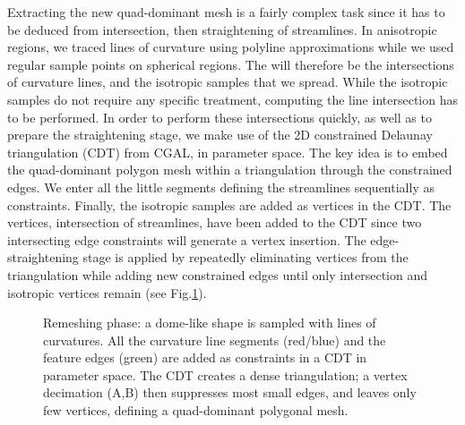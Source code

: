Extracting the new quad-dominant mesh is a fairly complex task since
it has to be deduced from intersection, then straightening of
streamlines.  In anisotropic regions, we traced lines of curvature
using polyline approximations while we used regular sample points on
spherical regions. The  will therefore be the
intersections of curvature lines, and the isotropic samples that we
spread. While the isotropic samples do not require any specific
treatment, computing the line intersection has to be performed.  In
order to perform these intersections quickly, as well as to prepare
the straightening stage, we make use of the 2D constrained Delaunay
triangulation (CDT) from CGAL, in parameter space. The key idea is to
embed the quad-dominant polygon mesh within a triangulation through
the constrained edges. We enter all the little segments defining the
streamlines sequentially as constraints.  Finally, the isotropic
samples are added as vertices in the CDT. The vertices, intersection
of streamlines, have  been added to the CDT
since two intersecting edge constraints will generate a vertex
insertion. The edge-straightening stage is applied by repeatedly
eliminating vertices from the triangulation while adding new
constrained edges until only intersection and isotropic vertices
remain (see Fig.\ref{fig:trimming}).

\begin{figure}
  \centering
  \caption{Remeshing phase: a dome-like shape is sampled with lines of
  curvatures. All the curvature line segments (red/blue) and the
  feature edges (green) are added as constraints in a CDT in parameter
  space. The CDT creates a dense triangulation; a vertex
  decimation (A,B) then suppresses most small edges, and leaves only
  few vertices, defining a quad-dominant polygonal mesh.}
  \label{fig:trimming}
\end{figure}


